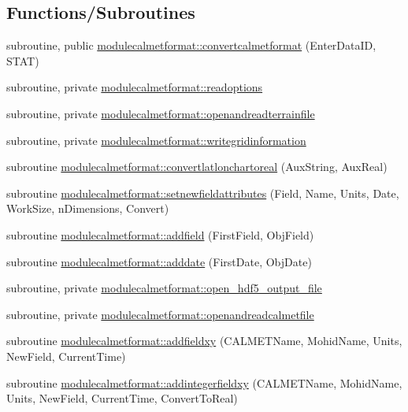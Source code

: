\subsection*{Functions/\+Subroutines}
\begin{DoxyCompactItemize}
\item 
subroutine, public \mbox{\hyperlink{namespacemodulecalmetformat_a46e7b8dbd76c834dd87aa502fa427ecf}{modulecalmetformat\+::convertcalmetformat}} (Enter\+Data\+ID, S\+T\+AT)
\item 
subroutine, private \mbox{\hyperlink{namespacemodulecalmetformat_a93959f38b7542f55aa7f2b9557c7ee20}{modulecalmetformat\+::readoptions}}
\item 
subroutine, private \mbox{\hyperlink{namespacemodulecalmetformat_a1c6e763c6740cd630346ca11aab5aa78}{modulecalmetformat\+::openandreadterrainfile}}
\item 
subroutine, private \mbox{\hyperlink{namespacemodulecalmetformat_aed24d711f305ad0c21d58e0ff79c9c02}{modulecalmetformat\+::writegridinformation}}
\item 
subroutine \mbox{\hyperlink{namespacemodulecalmetformat_a4d48e68e591262be2fdee84257034418}{modulecalmetformat\+::convertlatlonchartoreal}} (Aux\+String, Aux\+Real)
\item 
subroutine \mbox{\hyperlink{namespacemodulecalmetformat_a14590292a4c7892fcd59f55007069444}{modulecalmetformat\+::setnewfieldattributes}} (Field, Name, Units, Date, Work\+Size, n\+Dimensions, Convert)
\item 
subroutine \mbox{\hyperlink{namespacemodulecalmetformat_ad719aec457312263662ee69e4ff227fb}{modulecalmetformat\+::addfield}} (First\+Field, Obj\+Field)
\item 
subroutine \mbox{\hyperlink{namespacemodulecalmetformat_ac2b80a87e09960dca9aab0ddc8af00b5}{modulecalmetformat\+::adddate}} (First\+Date, Obj\+Date)
\item 
subroutine, private \mbox{\hyperlink{namespacemodulecalmetformat_a08504fdf416abe46eab39f11e6104b74}{modulecalmetformat\+::open\+\_\+hdf5\+\_\+output\+\_\+file}}
\item 
subroutine, private \mbox{\hyperlink{namespacemodulecalmetformat_a5ff4d55d88eac5ea8ceee14dbc6c26af}{modulecalmetformat\+::openandreadcalmetfile}}
\item 
subroutine \mbox{\hyperlink{namespacemodulecalmetformat_a620b75749d8d431ee5f1c9152211ebb0}{modulecalmetformat\+::addfieldxy}} (C\+A\+L\+M\+E\+T\+Name, Mohid\+Name, Units, New\+Field, Current\+Time)
\item 
subroutine \mbox{\hyperlink{namespacemodulecalmetformat_a26c3210caedd039907d56c2a6b8d30c4}{modulecalmetformat\+::addintegerfieldxy}} (C\+A\+L\+M\+E\+T\+Name, Mohid\+Name, Units, New\+Field, Current\+Time, Convert\+To\+Real)

\end{DoxyCompactItemize}
